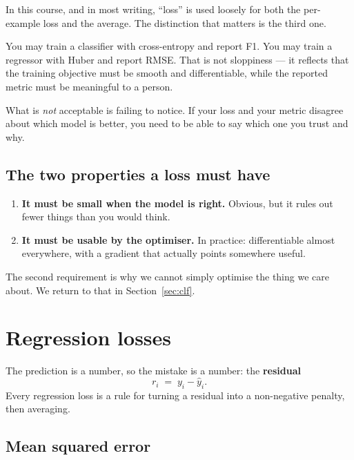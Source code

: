 \documentclass[11pt]{article}
\begin{document}
In this course, and in most writing, ``loss'' is used loosely for both the
per-example loss and the average. The distinction that matters is the third
one.

\begin{caution}
You may train a classifier with cross-entropy and report F1. You may train a
regressor with Huber and report RMSE. That is not sloppiness --- it reflects
that the training objective must be smooth and differentiable, while the
reported metric must be meaningful to a person.

What is \emph{not} acceptable is failing to notice. If your loss and your
metric disagree about which model is better, you need to be able to say which
one you trust and why.
\end{caution}

\subsection{The two properties a loss must have}

\begin{enumerate}[leftmargin=*]
  \item \textbf{It must be small when the model is right.} Obvious, but it
    rules out fewer things than you would think.
  \item \textbf{It must be usable by the optimiser.} In practice: differentiable
    almost everywhere, with a gradient that actually points somewhere useful.
\end{enumerate}

The second requirement is why we cannot simply optimise the thing we care
about. We return to that in Section~\ref{sec:clf}.

\newpage
\section{Regression losses}
\label{sec:reg}

The prediction is a number, so the mistake is a number: the \textbf{residual}
\[
  r_i \;=\; y_i - \hat{y}_i .
\]
Every regression loss is a rule for turning a residual into a non-negative
penalty, then averaging.

\subsection{Mean squared error}
\end{document}
